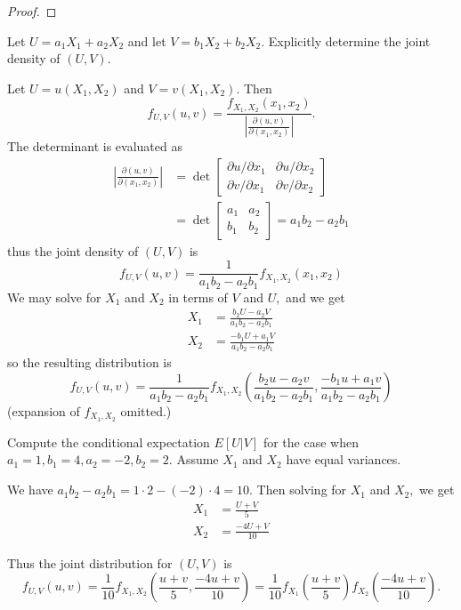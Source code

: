 \documentclass{article}
\begin{document}
\begin{enumerate}
\begin{enumerate}
\begin{proof}
			\end{proof}

		\ii Let $U=a_1X_1+a_2X_2$ and let $V=b_1X_2+b_2X_2.$ Explicitly determine the joint density of $(U, V).$
			\begin{soln}
				Let $U=u(X_1, X_2)$ and $V=v(X_1, X_2).$ Then \[f_{U, V}(u, v) = \frac{f_{X_1, X_2}(x_1, x_2)}{\left\lvert \frac{\partial(u, v)}{\partial(x_1, x_2)} \right\rvert}. \] The determinant is evaluated as 					
				\begin{align*}
					\left\lvert \frac{\partial(u, v)}{\partial(x_1, x_2)} \right\rvert &= \det\begin{bmatrix}
						\partial u/\partial x_1 & \partial u/\partial x_2 \\
						\partial v/\partial x_1 & \partial v/\partial x_2
					\end{bmatrix} \\
					&= \det \begin{bmatrix}
						a_1 & a_2 \\
						b_1 & b_2
					\end{bmatrix} = a_1b_2-a_2b_1
				\end{align*} thus the joint density of $(U, V)$ is 
				\[f_{U, V}(u, v) = \frac{1}{a_1b_2-a_2b_1}f_{X_1, X_2}(x_1, x_2)\]
				 We may solve for $X_1$ and $X_2$ in terms of $V$ and $U,$ and we get 
				\begin{align*}
					X_1 &= \frac{b_2U-a_2V}{a_1b_2-a_2b_1} \\
					X_2 &= \frac{-b_1U+a_1V}{a_1b_2-a_2b_1} 
				\end{align*} so the resulting distribution is
				\[f_{U, V}(u, v) = \boxed{\frac{1}{a_1b_2-a_2b_1}f_{X_1, X_2}\left( \frac{b_2u-a_2v}{a_1b_2-a_2b_1}, \frac{-b_1u+a_1v}{a_1b_2-a_2b_1} \right)}\]
				(expansion of $f_{X_1, X_2}$ omitted.)

			\end{soln}

		\ii Compute the conditional expectation $E[U|V]$ for the case when $a_1=1, b_1=4, a_2=-2, b_2=2.$ Assume $X_1$ and $X_2$ have equal variances.
			\begin{soln}
				We have $a_1b_2-a_2b_1=1\cdot2-(-2)\cdot4=10.$ Then solving for $X_1$ and $X_2,$ we get 
				\begin{align*}
					X_1 &=  \frac{U + V}{5} \\
					X_2 &= \frac{-4U+V}{10}
				\end{align*}

				Thus the joint distribution for $(U, V)$ is \[f_{U, V}(u, v) = \frac{1}{10}f_{X_1, X_2}\left( \frac{u+v}{5}, \frac{-4u+v}{10} \right) = \frac{1}{10}f_{X_1}\left( \frac{u+v}{5} \right)f_{X_2}\left( \frac{-4u+v}{10} \right). \] 


\end{soln}
\end{enumerate}
\end{enumerate}
\end{document}
